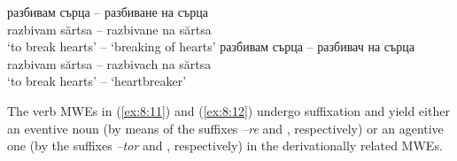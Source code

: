 \documentclass[output=paper]{langsci/langscibook}
\begin{document}
\begin{exe}
\ex \label{ex:8:12}
\settowidth{}
\begin{xlist}
\ex \label{ex:8:12a} 
\gll разбивам сърца -- разбиване на сърца\\
razbivam sărtsa  -- razbivane na sărtsa\\ 
‘to break hearts’ -- ‘breaking of hearts’ 
\ex \label{ex:8:12b} 
\gll разбивам сърца -- разбивач на сърца\\
razbivam sărtsa  -- razbivach na sărtsa\\ 
‘to break hearts’ -- ‘heartbreaker’ 
\end{xlist}
\end{exe}




The verb MWEs in (\ref{ex:8:11}) and (\ref{ex:8:12}) undergo suffixation and yield either an
eventive noun (by means of the suffixes \textit{–re} and , respectively)
or an agentive one (by the suffixes \textit{–tor} and , respectively)
in the derivationally related MWEs. 




\begin{table}[b]
\caption{Multiple derivations.}
\label{tab:8:2}
\end{table}
\end{document}
